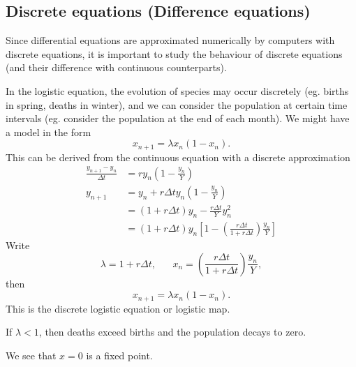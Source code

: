 \documentclass[a4paper]{article}
\begin{document}
\subsection{Discrete equations (Difference equations)}
Since differential equations are approximated numerically by computers with discrete equations, it is important to study the behaviour of discrete equations (and their difference with continuous counterparts).

In the logistic equation, the evolution of species may occur discretely (eg. births in spring, deaths in winter), and we can consider the population at certain time intervals (eg. consider the population at the end of each month). We might have a model in the form
\[
  x_{n + 1} = \lambda x_n(1 - x_n).
\]
This can be derived from the continuous equation with a discrete approximation
\begin{align*}
  \frac{y_{n+1} - y_n}{\Delta t} &= ry_n\left(1 - \frac{y_n}{Y}\right)\\
  y_{n + 1} &= y_n + r\Delta ty_n\left(1 - \frac{y_n}{Y}\right)\\
  &= (1 + r\Delta t)y_n - \frac{r\Delta t}{Y}y_n^2\\
  &= (1 + r\Delta t)y_n\left[1 - \left(\frac{r\Delta t}{1 + r\Delta t}\right)\frac{y_n}{Y}\right]
\end{align*}
Write
\[
  \lambda = 1 + r\Delta t,\;\;\;\;\;\; x_n = \left(\frac{r\Delta t}{1 + r\Delta t}\right)\frac{y_n}{Y},
\]
then
\[
  x_{n+1}=\lambda x_n(1 - x_n).
\]
This is the discrete logistic equation or logistic map.

If $\lambda  < 1$, then deaths exceed births and the population decays to zero.
\begin{center}
\end{center}
We see that $x = 0$ is a fixed point.
\end{document}
